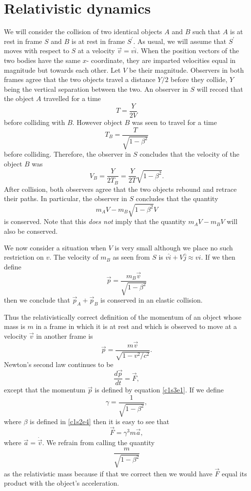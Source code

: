 \section{Relativistic dynamics}\label{c1s3}
We will consider the collision of two identical objects $A$ and $B$ such that
$A$ is at rest in frame $S$ and $B$ is at rest in frame $S^\prime$. As usual, 
we will assume that $S^\prime$ moves with respect to $S$ at a velocity $\vec{v}
= v\hat{i}$. When the position vectors of the two bodies have the same $x$-
coordinate, they are imparted velocities equal in magnitude but towards each
other. Let $V$ be their magnitude. Observers in both frames agree that the
two objects travel a distance $Y/2$ before they collide, $Y$ being the vertical
separation between the two. An observer in $S$ will record that the object $A$
travelled for a time
\[
T = \frac{Y}{2V}
\]
before colliding with $B$. However object $B$ was seen to travel for a time
\[
T_B = \frac{T}{\sqrt{1 - \beta^2}}
\]
before colliding. Therefore, the observer in $S$ concludes that the velocity
of the object $B$ was
\[
V_B = \frac{Y}{2T_B} = \frac{Y}{2T}\sqrt{1 - \beta^2}.
\]
After collision, both observers agree that the two objects rebound and retrace
their paths. In particular, the observer in $S$ concludes that the quantity
\[
m_AV - m_B\sqrt{1 - \beta^2}V
\]
is conserved. Note that this \emph{does not} imply that the quantity $m_AV -
m_BV$ will also be conserved. 

We now consider a situation when $V$ is very small although we place no such
restriction on $v$. The velocity of $m_B$ as seen from $S$ is $v\hat{i} + 
V\hat{j} \approx v\hat{i}$. If we then define
\[
\vec{p} = \frac{m_B\vec{v}}{\sqrt{1 - \beta^2}}
\]
then we conclude that $\vec{p}_A + \vec{p}_B$ is conserved in an elastic 
collision.

Thus the relativistically correct definition of the
momentum of an object whose mass is $m$ in a frame in which it is at rest
and which is observed to move at a velocity $\vec{v}$ in another frame is
\begin{equation}\label{c1s3e1}
\vec{p} = \frac{m\vec{v}}{\sqrt{1 - v^2/c^2}}.
\end{equation}
Newton's second law continues to be
\begin{equation}\label{c1s3e2}
\frac{d\vec{p}}{dt} = \vec{F},
\end{equation}
except that the momentum $\vec{p}$ is defined by equation \eqref{c1s3e1}. If
we define
\begin{equation}\label{c1s3e3}
\gamma = \frac{1}{\sqrt{1 - \beta^2}},
\end{equation}
where $\beta$ is defined in \eqref{c1s2e4} then it is easy to see that
\begin{equation}\label{c1s3e4}
\vec{F} = \gamma^3 m\vec{a},
\end{equation}
where $\vec{a} = \dot{\vec{v}}$. We refrain from calling the quantity
\[
\frac{m}{\sqrt{1 - \beta^2}}
\]
as the relativistic mass because if that we correct then we would have $\vec{F}$
equal its product with the object's acceleration. 

